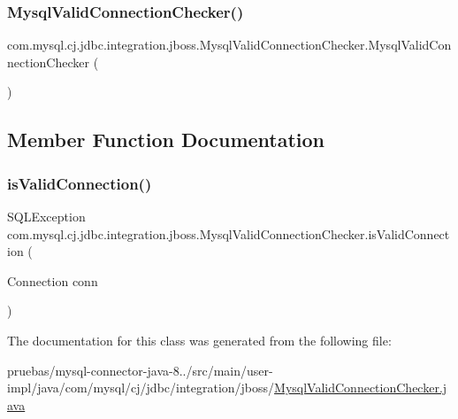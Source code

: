 \subsubsection{\texorpdfstring{Mysql\+Valid\+Connection\+Checker()}{MysqlValidConnectionChecker()}}
{\footnotesize\ttfamily com.\+mysql.\+cj.\+jdbc.\+integration.\+jboss.\+Mysql\+Valid\+Connection\+Checker.\+Mysql\+Valid\+Connection\+Checker (\begin{DoxyParamCaption}{ }\end{DoxyParamCaption})}



\subsection{Member Function Documentation}
\mbox{\label{classcom_1_1mysql_1_1cj_1_1jdbc_1_1integration_1_1jboss_1_1_mysql_valid_connection_checker_a1128671b67d25ea87ad6f48b371d48a4}} 
\subsubsection{\texorpdfstring{is\+Valid\+Connection()}{isValidConnection()}}
{\footnotesize\ttfamily S\+Q\+L\+Exception com.\+mysql.\+cj.\+jdbc.\+integration.\+jboss.\+Mysql\+Valid\+Connection\+Checker.\+is\+Valid\+Connection (\begin{DoxyParamCaption}\item[{Connection}]{conn }\end{DoxyParamCaption})}



The documentation for this class was generated from the following file\+:\begin{DoxyCompactItemize}
\item 
pruebas/mysql-\/connector-\/java-\/8../src/main/user-\/impl/java/com/mysql/cj/jdbc/integration/jboss/\mbox{\hyperlink{_mysql_valid_connection_checker_8java}{Mysql\+Valid\+Connection\+Checker.\+java}}\end{DoxyCompactItemize}
